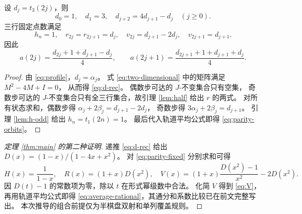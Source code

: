 \begin{proposition}\label{prop:parity}
设 $d_j=t_3(2j)$，则
\begin{equation}\label{eq:d-rec}
 d_0=1,\quad d_1=3,\quad d_{j+2}=4d_{j+1}-d_j\quad(j\ge0).
\end{equation}
三行固定点数满足
\begin{equation}\label{eq:parity-fixed}
 h_n=1,\quad r_{2j}=r_{2j+1}=d_j,\quad
 v_{2j}=d_{j+1}-2d_j,\quad v_{2j+1}=d_{j+1}.
\end{equation}
因此
\begin{equation}\label{eq:parity-orbits}
 a(2j)=\frac{d_{2j}+1+d_{j+1}-d_j}{4},\qquad
 a(2j+1)=\frac{d_{2j+1}+1+d_{j+1}+d_j}{4}.
\end{equation}
\end{proposition}
\begin{proof}
由 \eqref{eq:profile}，$d_j=\alpha_j$。
式 \eqref{eq:two-dimensional} 中的矩阵满足 $M^2-4M+I=0$，
从而得 \eqref{eq:d-rec}。
偶数步可达的 $J$-不变集合只有空集，
奇数步可达的 $J$-不变集合只有全三行集合，故引理 \ref{lem:half} 给出 $r$ 的两式。
对所有状态求和，偶数步得
$\alpha_j+2\beta_j=d_{j+1}-2d_j$，
奇数步得 $3\alpha_j+2\beta_j=d_{j+1}$。
引理 \ref{lem:h-odd} 给出 $h_n=t_1(2n)=1$。
最后代入轨道平均公式即得 \eqref{eq:parity-orbits}。
\end{proof}

\begin{proof}[定理 \ref{thm:main} 的第二种证明]
递推 \eqref{eq:d-rec} 给出 $D(x)=(1-x)/(1-4x+x^2)$。
对 \eqref{eq:parity-fixed} 分别求和可得
\[
 H(x)=\frac1{1-x},\quad R(x)=(1+x)D(x^2),\quad
 V(x)=(1+x)\frac{D(x^2)-1}{x^2}-2D(x^2).
\]
因 $D(t)-1$ 的常数项为零，除以 $t$ 在形式幂级数中合法。
化简 $V$ 得到 \eqref{eq:V}，再用轨道平均公式即得
\eqref{eq:average-rational}，其通分和系数比较已在前文完整写出。
本次推导的组合前提仅为半棋盘双射和单列覆盖规则。
\end{proof}
